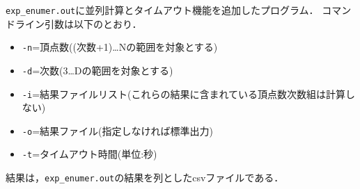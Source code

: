 \texttt{exp\_enumer.out}に並列計算とタイムアウト機能を追加したプログラム．
コマンドライン引数は以下のとおり．

\begin{itemize}
\tightlist
\item
  \texttt{-n}=頂点数((次数+1)\ldots{}Nの範囲を対象とする)
\item
  \texttt{-d}=次数(3\ldots{}Dの範囲を対象とする)
\item
  \texttt{-i}=結果ファイルリスト(これらの結果に含まれている頂点数次数組は計算しない)
\item
  \texttt{-o}=結果ファイル(指定しなければ標準出力)
\item
  \texttt{-t}=タイムアウト時間(単位:秒)
\end{itemize}

結果は，\texttt{exp\_enumer.out}の結果を列としたcsvファイルである．
